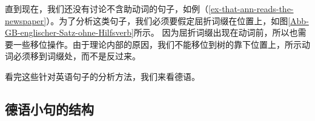 直到现在，我们还没有讨论不含助动词的句子，如例（\ref{ex-that-ann-reads-the-newspaper}）。为了分析这类句子，我们必须要假定屈折词缀在\inullc 位置上，如图\vref{Abb-GB-englischer-Satz-ohne-Hilfsverb}所示。
因为屈折词缀出现在动词前，所以也需要一些移位操作。由于理论内部的原因，我们不能移位到树的靠下位置上，所示动词必须移到词缀处，而不是反过来。
%

看完这些针对英语句子的分析方法，我们来看德语。

\subsection{德语小句的结构}
\label{sec-German-clause}

